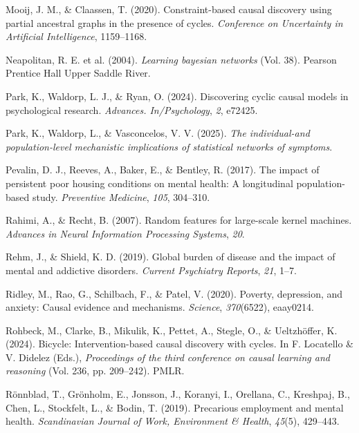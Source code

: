 \documentclass[
]{article}
\newlength{\cslhangindent}
\newenvironment{CSLReferences}[2] %
 {\begin{list}{}{%
  \setlength{\itemindent}{0pt}
  \setlength{\leftmargin}{0pt}
  \setlength{\parsep}{0pt}
  \ifodd #1
   \setlength{\leftmargin}{\cslhangindent}
   \setlength{\itemindent}{-1\cslhangindent}
  \fi
  \setlength{\itemsep}{#2\baselineskip}}}
 {\end{list}}
\begin{document}
\begin{CSLReferences}{1}{0}
Mooij, J. M., \& Claassen, T. (2020). Constraint-based causal discovery
using partial ancestral graphs in the presence of cycles.
\emph{Conference on Uncertainty in Artificial Intelligence}, 1159--1168.

Neapolitan, R. E. et al. (2004). \emph{Learning bayesian networks} (Vol.
38). Pearson Prentice Hall Upper Saddle River.

Park, K., Waldorp, L. J., \& Ryan, O. (2024). Discovering cyclic causal
models in psychological research. \emph{Advances. In/Psychology},
\emph{2}, e72425.

Park, K., Waldorp, L., \& Vasconcelos, V. V. (2025). \emph{The
individual-and population-level mechanistic implications of statistical
networks of symptoms}.

Pevalin, D. J., Reeves, A., Baker, E., \& Bentley, R. (2017). The impact
of persistent poor housing conditions on mental health: A longitudinal
population-based study. \emph{Preventive Medicine}, \emph{105},
304--310.

Rahimi, A., \& Recht, B. (2007). Random features for large-scale kernel
machines. \emph{Advances in Neural Information Processing Systems},
\emph{20}.

Rehm, J., \& Shield, K. D. (2019). Global burden of disease and the
impact of mental and addictive disorders. \emph{Current Psychiatry
Reports}, \emph{21}, 1--7.

Ridley, M., Rao, G., Schilbach, F., \& Patel, V. (2020). Poverty,
depression, and anxiety: Causal evidence and mechanisms. \emph{Science},
\emph{370}(6522), eaay0214.

Rohbeck, M., Clarke, B., Mikulik, K., Pettet, A., Stegle, O., \&
Ueltzhöffer, K. (2024). Bicycle: Intervention-based causal discovery
with cycles. In F. Locatello \& V. Didelez (Eds.), \emph{Proceedings of
the third conference on causal learning and reasoning} (Vol. 236, pp.
209--242). PMLR.

Rönnblad, T., Grönholm, E., Jonsson, J., Koranyi, I., Orellana, C.,
Kreshpaj, B., Chen, L., Stockfelt, L., \& Bodin, T. (2019). Precarious
employment and mental health. \emph{Scandinavian Journal of Work,
Environment \& Health}, \emph{45}(5), 429--443.


\end{CSLReferences}
\end{document}
